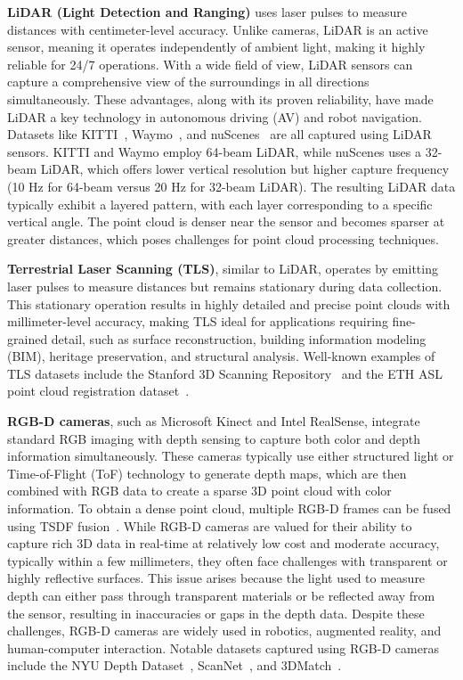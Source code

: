 \noindent
\textbf{LiDAR (Light Detection and Ranging)} uses laser pulses to measure distances with centimeter-level accuracy. Unlike cameras, LiDAR is an active sensor, meaning it operates independently of ambient light, making it highly reliable for 24/7 operations. With a wide field of view, LiDAR sensors can capture a comprehensive view of the surroundings in all directions simultaneously. These advantages, along with its proven reliability, have made LiDAR a key technology in autonomous driving (AV) and robot navigation. Datasets like KITTI~\cite{geiger2012we}, Waymo~\cite{sun2020scalability}, and nuScenes~\cite{caesar2020nuscenes} are all captured using LiDAR sensors. KITTI and Waymo employ 64-beam LiDAR, while nuScenes uses a 32-beam LiDAR, which offers lower vertical resolution but higher capture frequency (10 Hz for 64-beam versus 20 Hz for 32-beam LiDAR). The resulting LiDAR data typically exhibit a layered pattern, with each layer corresponding to a specific vertical angle. The point cloud is denser near the sensor and becomes sparser at greater distances, which poses challenges for point cloud processing techniques.

\noindent
\textbf{Terrestrial Laser Scanning (TLS)}, similar to LiDAR, operates by emitting laser pulses to measure distances but remains stationary during data collection. This stationary operation results in highly detailed and precise point clouds with millimeter-level accuracy, making TLS ideal for applications requiring fine-grained detail, such as surface reconstruction, building information modeling (BIM), heritage preservation, and structural analysis. Well-known examples of TLS datasets include the Stanford 3D Scanning Repository~\cite{curless1996volumetric} and the ETH ASL point cloud registration dataset~\cite{Pomerleau_2012}.

\noindent
\textbf{RGB-D cameras}, such as Microsoft Kinect and Intel RealSense, integrate standard RGB imaging with depth sensing to capture both color and depth information simultaneously. These cameras typically use either structured light or Time-of-Flight (ToF) technology to generate depth maps, which are then combined with RGB data to create a sparse 3D point cloud with color information. To obtain a dense point cloud, multiple RGB-D frames can be fused using TSDF fusion~\cite{curless1996volumetric,zeng20163dmatch}. While RGB-D cameras are valued for their ability to capture rich 3D data in real-time at relatively low cost and moderate accuracy, typically within a few millimeters, they often face challenges with transparent or highly reflective surfaces. This issue arises because the light used to measure depth can either pass through transparent materials or be reflected away from the sensor, resulting in inaccuracies or gaps in the depth data. Despite these challenges, RGB-D cameras are widely used in robotics, augmented reality, and human-computer interaction. Notable datasets captured using RGB-D cameras include the NYU Depth Dataset~\cite{Silberman_ECCV12}, ScanNet~\cite{dai2017scannet}, and 3DMatch~\cite{zeng20163dmatch}.

